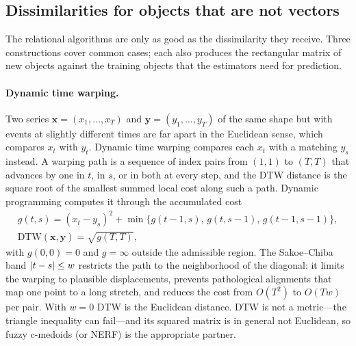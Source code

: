 \subsection{Dissimilarities for objects that are not vectors}\label{sec:rel:dissim}

The relational algorithms are only as good as the dissimilarity they receive. Three constructions cover common cases; each also produces the rectangular matrix of new objects against the training objects that the estimators need for prediction.

\paragraph{Dynamic time warping.} Two series $\mathbf{x}=(x_1,\dots,x_T)$ and $\mathbf{y}=(y_1,\dots,y_T)$ of the same shape but with events at slightly different times are far apart in the Euclidean sense, which compares $x_t$ with $y_t$. Dynamic time warping \cite{sakoe:1978:dtw} compares each $x_t$ with a matching $y_s$ instead. A warping path is a sequence of index pairs from $(1,1)$ to $(T,T)$ that advances by one in $t$, in $s$, or in both at every step, and the DTW distance is the square root of the smallest summed local cost along such a path. Dynamic programming computes it through the accumulated cost
\begin{equation}
  \begin{gathered}
  g(t,s)=(x_t-y_s)^2+\min\{g(t-1,s),\,g(t,s-1),\,g(t-1,s-1)\},\\
  \mathrm{DTW}(\mathbf{x},\mathbf{y})=\sqrt{g(T,T)},
  \end{gathered}
  \label{eq:rel:dtw}
\end{equation}
with $g(0,0)=0$ and $g=\infty$ outside the admissible region. The Sakoe--Chiba band $\left\lvert t-s \right\rvert\le w$ restricts the path to the neighborhood of the diagonal: it limits the warping to plausible displacements, prevents pathological alignments that map one point to a long stretch, and reduces the cost from $O(T^2)$ to $O(Tw)$ per pair. With $w=0$ DTW is the Euclidean distance. DTW is not a metric---the triangle inequality can fail---and its squared matrix is in general not Euclidean, so fuzzy c-medoids (or NERF) is the appropriate partner.

